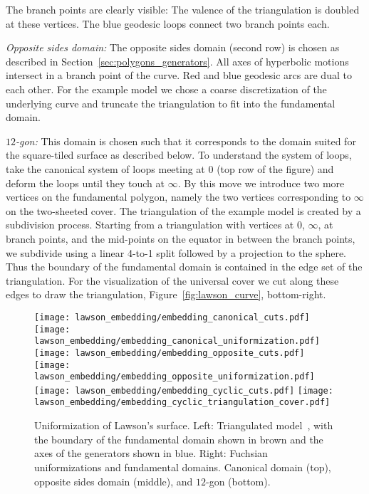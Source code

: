 \documentclass[Thesis]{subfiles}
\begin{document}
 The branch points are clearly visible: The valence of the triangulation is doubled at these vertices.
 The blue geodesic loops connect two branch points each.

 \textit{Opposite sides domain:}
 The opposite sides domain (second row) is chosen as described in Section~\ref{sec:polygons_generators}.
 All axes of hyperbolic motions intersect in a branch point of the curve.
 Red and blue geodesic arcs are dual to each other.
 For the example model we chose a coarse discretization of the underlying curve and truncate the triangulation to fit into the fundamental domain.

 \textit{$12$-gon:}
This domain is chosen such that it corresponds to the domain suited for the square-tiled surface as described below.
To understand the system of loops, take the canonical system of loops meeting at $0$ (top row of the figure) and deform the loops until they touch at $\infty$.
 By this move we introduce two more vertices on the fundamental polygon, namely the two vertices corresponding to $\infty$ on the two-sheeted cover.
 The triangulation of the example model is created by a subdivision process.
 Starting from  a triangulation with vertices at $0$, $\infty$, at branch points, and the mid-points on the equator in between the branch points, we subdivide using a linear 4-to-1 split followed by a projection to the sphere. Thus the boundary of the fundamental domain is contained in the edge set of the triangulation. For the visualization of the universal cover we cut along these edges to draw the triangulation, Figure~\ref{fig:lawson_curve}, bottom-right.


\begin{figure}
	\centering
	\resizebox{!}{6.3cm} {
	\texttt{[image: lawson\_embedding/embedding\_canonical\_cuts.pdf]}
	\texttt{[image: lawson\_embedding/embedding\_canonical\_uniformization.pdf]}
	}
	\resizebox{!}{6.3cm} {
	\texttt{[image: lawson\_embedding/embedding\_opposite\_cuts.pdf]}
	\texttt{[image: lawson\_embedding/embedding\_opposite\_uniformization.pdf]}
	}
	\resizebox{!}{6.6cm} {
	\texttt{[image: lawson\_embedding/embedding\_cyclic\_cuts.pdf]}
	\hspace{4mm}
	\texttt{[image: lawson\_embedding/embedding\_cyclic\_triangulation\_cover.pdf]}
	}
	\caption{Uniformization of Lawson's surface. Left:
          Triangulated model~\cite{polthier97}, with the boundary of
          the fundamental domain shown in brown and the axes of the
          generators shown in blue. Right: Fuchsian uniformizations and
          fundamental domains. Canonical domain (top), opposite sides
          domain (middle), and $12$-gon (bottom).}
	\label{fig:lawson_embedding}
\end{figure}
\end{document}
